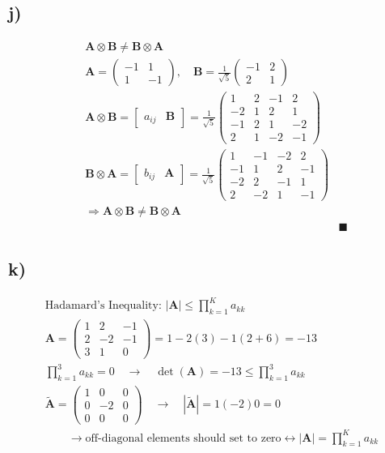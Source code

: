 \subsection*{j)}
\begin{align*}
	&\mathbf{A\otimes B\neq B\otimes A}& \\
	&\mathbf{A}=
	\begin{pmatrix}
	-1 & 1 \\
	1 & -1 
	\end{pmatrix},\quad\mathbf{B}=\frac{1}{\sqrt{5}}
	\begin{pmatrix}
	-1 & 2 \\
	2 & 1
	\end{pmatrix}& \\
	&\mathbf{A\otimes B}=
	\begin{bmatrix}
	a_{ij} & \mathbf{B}
	\end{bmatrix}=\frac{1}{\sqrt{5}}
	\begin{pmatrix}
	1 & 2 & -1 & 2 \\
	-2 & 1 & 2 & 1 \\
	-1 & 2 & 1 & -2 \\
	2 & 1 & -2 & -1
	\end{pmatrix}& \\
	&\mathbf{B\otimes A}=
	\begin{bmatrix}
	b_{ij} & \mathbf{A}
	\end{bmatrix}=\frac{1}{\sqrt{5}}
	\begin{pmatrix}
	1 & -1 & -2 & 2 \\
	-1 & 1 & 2 & -1 \\
	-2 & 2 & -1 & 1 \\
	2 & -2 & 1 & -1
	\end{pmatrix}& \\
	&\Rightarrow\mathbf{A\otimes B\neq B\otimes A}& \\
	& &\blacksquare
\end{align*}

\subsection*{k)}
\begin{align*}
	&\text{Hadamard's Inequality: }\left|\mathbf{A}\right|\le\prod_{k=1}^{K}a_{kk}& \\
	&\mathbf{A}=
	\begin{pmatrix}
	1 & 2 & -1 \\
	2 & -2 & -1 \\
	3 & 1 & 0
	\end{pmatrix}=1-2\left(3\right)-1\left(2+6\right)=-13& \\
	&\prod_{k=1}^{3}a_{kk}=0\quad\rightarrow\quad\det\left(\mathbf{A}\right)=-13\le\prod_{k=1}^{3}a_{kk}& \\
	&\tilde{\mathbf{A}}=
	\begin{pmatrix}
	1 & 0 & 0 \\
	0 & -2 & 0 \\
	0 & 0 & 0
	\end{pmatrix}\quad\rightarrow\quad\left|\tilde{\mathbf{A}}\right|=1\left(-2\right)0=0& \\
	&\qquad\rightarrow\text{off-diagonal elements should set to zero}\leftrightarrow\left|\mathbf{A}\right|=\prod_{k=1}^{K}a_{kk}&
\end{align*}